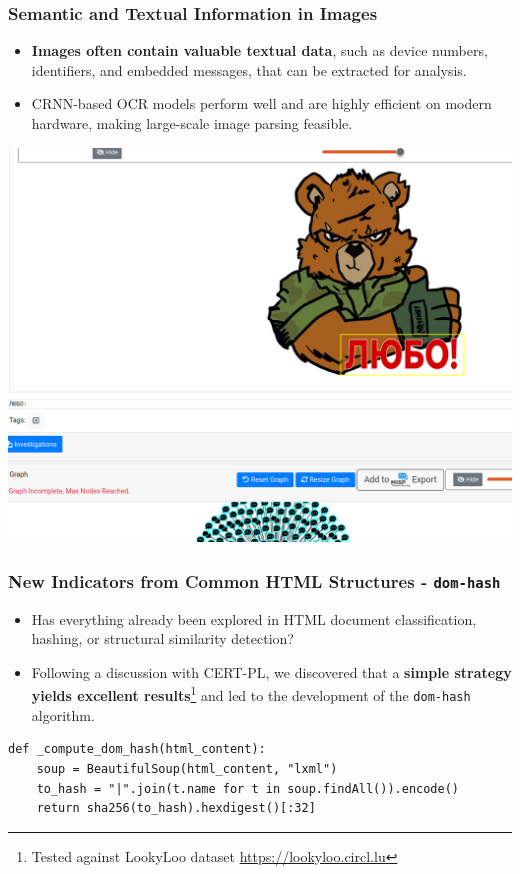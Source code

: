 \documentclass[10pt,aspectratio=169, colorlinks=true, linkcolor=circlBlue]{beamer}
\begin{document}
\begin{frame}
    \frametitle{Semantic and Textual Information in Images}
    \begin{itemize}
	    \item {\bf Images often contain valuable textual data}, such as device numbers, identifiers, and embedded messages, that can be extracted for analysis.
        \item CRNN-based OCR models perform well and are highly efficient on modern hardware, making large-scale image parsing feasible.
    \end{itemize}
    \begin{center}
        \includegraphics[scale=0.15]{./img/ocr-2.png}
    \end{center}
\end{frame}

\begin{frame}[fragile]
    \frametitle{New Indicators from Common HTML Structures - \texttt{dom-hash}}

    \begin{itemize}
        \item Has everything already been explored in HTML document classification, hashing, or structural similarity detection?
        \item Following a discussion with CERT-PL, we discovered that a {\bf simple strategy yields excellent results}\footnote{Tested against LookyLoo dataset \url{https://lookyloo.circl.lu}} and led to the development of the \texttt{dom-hash} algorithm.
    \end{itemize}

    \vspace{1em}

    \begin{verbatim}
def _compute_dom_hash(html_content):
    soup = BeautifulSoup(html_content, "lxml")
    to_hash = "|".join(t.name for t in soup.findAll()).encode()
    return sha256(to_hash).hexdigest()[:32]
    \end{verbatim}

\end{frame}
\end{document}
